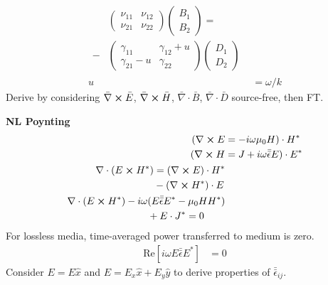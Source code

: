 \documentclass[12pt]{article}
\begin{document}
\begin{multicols}{3}
\begin{align}
\begin{split}
  &\begin{pmatrix}
    \nu_{11} & \nu_{12}\\
    \nu_{21} & \nu_{22}
  \end{pmatrix}
  {}\begin{pmatrix}
    B_1\\
    B_2
  \end{pmatrix} =\\
  -&\begin{pmatrix}
    \gamma_{11} & \gamma_{12} + u\\
    \gamma_{21} - u & \gamma_{22}
  \end{pmatrix}
  \begin{pmatrix}
      D_1\\
      D_2
  \end{pmatrix}
  \end{split}\\
  u &= \omega / k
\end{align}
Derive by considering $\bar{\nabla} \cross \bar{E}$, $\bar{\nabla} \cross \bar{H}$,
$\bar{\nabla} \cdot \bar{B}$, $\bar{\nabla} \cdot \bar{D}$ source-free, then FT.

\textbf{NL Poynting}
\begin{align}
  (\nabla \cross E &= -i \omega \mu_0 H) \cdot H^{*}\\
  (\nabla \cross H &= J + i \omega \bar{\bar{\epsilon}} E) \cdot E^{*}\\
  \begin{split}
    \nabla \cdot (E \cross H^{*}) &= (\nabla \cross E) \cdot H^*\\
    &- (\nabla \cross H^{*}) \cdot E
  \end{split}\\
  \begin{split}
    \nabla \cdot (E \cross H^*) - i \omega &(E \bar{\bar{\epsilon}} E^* - \mu_0 H H^*)\\
    &+ E \cdot J^* = 0
  \end{split}
\end{align}
For lossless media, time-averaged power transferred to medium is zero.
\begin{align}
  \textrm{Re}[i\omega E \bar{\bar{\epsilon}} E^*] &= 0
\end{align}
Consider $E = E \hat{x}$ and $E = E_x \hat{x} + E_y \hat{y}$ to derive properties
of $\bar{\bar{\epsilon}}_{ij}$.


\end{multicols}
\end{document}
